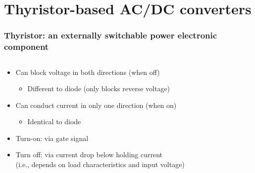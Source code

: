 \section{Thyristor-based AC/DC converters}

\begin{frame}[c]
    \frametitle{Thyristor: an externally switchable power electronic component}
    \begin{columns}
        \begin{column}{0.66\textwidth}
            \begin{itemize}
                \item Can block voltage in both directions (when off)
                \begin{itemize}
                    \item Different to diode (only blocks reverse voltage)
                \end{itemize}
                \item Can conduct current in only one direction (when on)
                \begin{itemize}
                    \item Identical to diode
                \end{itemize}
                \item<2-> Turn-on: via gate signal
                \item<3-> Turn off: via current drop below holding current \\(i.e., depends on load characteristics and input voltage)
            \end{itemize}
            \vspace{-0.7cm}
        \end{column}
        \begin{column}{0.33\textwidth}
                \centering
        

\end{column}
\end{columns}
\end{frame}
